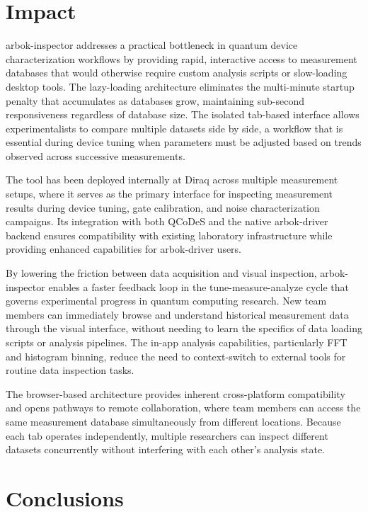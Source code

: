 \section{Impact}

arbok-inspector addresses a practical bottleneck in quantum device characterization workflows by providing rapid, interactive access to measurement databases that would otherwise require custom analysis scripts or slow-loading desktop tools.
The lazy-loading architecture eliminates the multi-minute startup penalty that accumulates as databases grow, maintaining sub-second responsiveness regardless of database size.
The isolated tab-based interface allows experimentalists to compare multiple datasets side by side, a workflow that is essential during device tuning when parameters must be adjusted based on trends observed across successive measurements.

The tool has been deployed internally at Diraq across multiple measurement setups, where it serves as the primary interface for inspecting measurement results during device tuning, gate calibration, and noise characterization campaigns.
Its integration with both QCoDeS and the native arbok-driver backend ensures compatibility with existing laboratory infrastructure while providing enhanced capabilities for arbok-driver users.

By lowering the friction between data acquisition and visual inspection, arbok-inspector enables a faster feedback loop in the tune-measure-analyze cycle that governs experimental progress in quantum computing research.
New team members can immediately browse and understand historical measurement data through the visual interface, without needing to learn the specifics of data loading scripts or analysis pipelines.
The in-app analysis capabilities, particularly FFT and histogram binning, reduce the need to context-switch to external tools for routine data inspection tasks.

The browser-based architecture provides inherent cross-platform compatibility and opens pathways to remote collaboration, where team members can access the same measurement database simultaneously from different locations.
Because each tab operates independently, multiple researchers can inspect different datasets concurrently without interfering with each other's analysis state.

\section{Conclusions}

